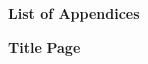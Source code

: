 \begin{titlepage}
\label{front:appendices}

    \begin{center}
        {\fontsize{14}{18}\selectfont \textbf{List of Appendices}}
    \end{center}

    \vspace*{48pt} 

    \noindent
    {\fontsize{12}{14}\selectfont \textbf{Title}} \hfill {\fontsize{12}{14}\selectfont \textbf{Page}} \\[12pt] %

    {\fontsize{12}{14}\selectfont
    \makeatletter
    \renewcommand{\cftappxleader}{\hfill}
    \renewcommand{\@pnumwidth}{1.55em}
    \renewcommand{\@tocrmarg}{2.55em}
    
    \makeatother
    }

\end{titlepage}

